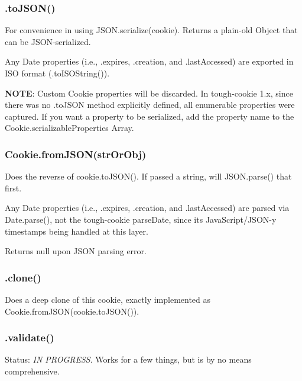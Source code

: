 \subsubsection*{{\ttfamily .to\+J\+S\+O\+N()}}

For convenience in using {\ttfamily J\+S\+O\+N.\+serialize(cookie)}. Returns a plain-\/old {\ttfamily Object} that can be J\+S\+O\+N-\/serialized.

Any {\ttfamily Date} properties (i.\+e., {\ttfamily .expires}, {\ttfamily .creation}, and {\ttfamily .last\+Accessed}) are exported in I\+S\+O format ({\ttfamily .to\+I\+S\+O\+String()}).

{\bfseries N\+O\+T\+E}\+: Custom {\ttfamily Cookie} properties will be discarded. In tough-\/cookie 1.\+x, since there was no {\ttfamily .to\+J\+S\+O\+N} method explicitly defined, all enumerable properties were captured. If you want a property to be serialized, add the property name to the {\ttfamily Cookie.\+serializable\+Properties} Array.

\subsubsection*{{\ttfamily Cookie.\+from\+J\+S\+O\+N(str\+Or\+Obj)}}

Does the reverse of {\ttfamily cookie.\+to\+J\+S\+O\+N()}. If passed a string, will {\ttfamily J\+S\+O\+N.\+parse()} that first.

Any {\ttfamily Date} properties (i.\+e., {\ttfamily .expires}, {\ttfamily .creation}, and {\ttfamily .last\+Accessed}) are parsed via {\ttfamily Date.\+parse()}, not the tough-\/cookie {\ttfamily parse\+Date}, since it\textquotesingle{}s Java\+Script/\+J\+S\+O\+N-\/y timestamps being handled at this layer.

Returns {\ttfamily null} upon J\+S\+O\+N parsing error.

\subsubsection*{{\ttfamily .clone()}}

Does a deep clone of this cookie, exactly implemented as {\ttfamily Cookie.\+from\+J\+S\+O\+N(cookie.\+to\+J\+S\+O\+N())}.

\subsubsection*{{\ttfamily .validate()}}

Status\+: {\itshape I\+N P\+R\+O\+G\+R\+E\+S\+S}. Works for a few things, but is by no means comprehensive.

